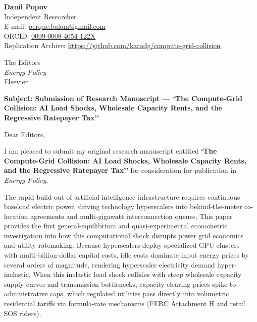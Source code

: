\documentclass[10.5pt]{article}
\begin{document}
\noindent \textbf{Danil Popov} \\
Independent Researcher \\
E-mail: \href{mailto:perque.balom@gmail.com}{perque.balom@gmail.com} \\
ORCID: \href{https://orcid.org/0009-0008-4054-122X}{0009-0008-4054-122X} \\
Replication Archive: \url{https://github.com/karodg/compute-grid-collision} \\
\vspace{0.3cm}

\noindent The Editors \\
\textit{Energy Policy} \\
Elsevier \\
\vspace{0.25cm}

\noindent \textbf{Subject: Submission of Research Manuscript --- `The Compute-Grid Collision: AI Load Shocks, Wholesale Capacity Rents, and the Regressive Ratepayer Tax''} \\
\vspace{0.2cm}

\noindent Dear Editors, \\
\vspace{0.15cm}

\noindent I am pleased to submit my original research manuscript entitled \textbf{`The Compute-Grid Collision: AI Load Shocks, Wholesale Capacity Rents, and the Regressive Ratepayer Tax''} for consideration for publication in \textit{Energy Policy}.

The rapid build-out of artificial intelligence infrastructure requires continuous baseload electric power, driving technology hyperscalers into behind-the-meter co-location agreements and multi-gigawatt interconnection queues. This paper provides the first general-equilibrium and quasi-experimental econometric investigation into how this computational shock disrupts power grid economics and utility ratemaking. Because hyperscalers deploy specialized GPU clusters with multi-billion-dollar capital costs, idle costs dominate input energy prices by several orders of magnitude, rendering hyperscaler electricity demand hyper-inelastic. When this inelastic load shock collides with steep wholesale capacity supply curves and transmission bottlenecks, capacity clearing prices spike to administrative caps, which regulated utilities pass directly into volumetric residential tariffs via formula-rate mechanisms (FERC Attachment H and retail SOS riders).
\end{document}
